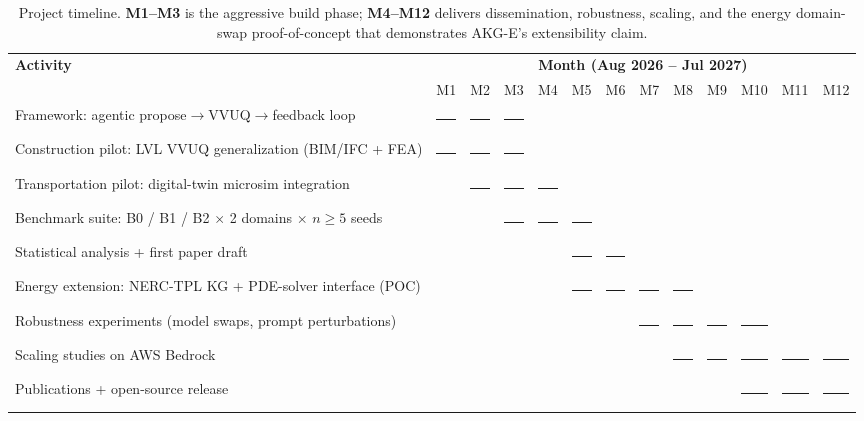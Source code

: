 \documentclass[conference, 10pt]{IEEEtran}
\newcommand{\gantt}{\rule[0.5pt]{14pt}{6pt}}
\begin{document}
\begin{table}[!ht]
\centering
\renewcommand{\arraystretch}{1.15}
\setlength{\tabcolsep}{4pt}
\caption{Project timeline. \textbf{M1--M3} is the aggressive build phase; \textbf{M4--M12} delivers dissemination, robustness, scaling, and the energy domain-swap proof-of-concept that demonstrates AKG-E's extensibility claim.}
\label{tab:gantt}
\footnotesize
\begin{tabular}{p{2.7in}|cccccccccccc}
\toprule
\textbf{Activity} & \multicolumn{12}{c}{\textbf{Month (Aug 2026 -- Jul 2027)}} \\
& M1 & M2 & M3 & M4 & M5 & M6 & M7 & M8 & M9 & M10 & M11 & M12 \\
\midrule
Framework: agentic propose$\to$VVUQ$\to$feedback loop & \gantt & \gantt & \gantt & & & & & & & & & \\
Construction pilot: LVL VVUQ generalization (BIM/IFC + FEA) & \gantt & \gantt & \gantt & & & & & & & & & \\
Transportation pilot: digital-twin microsim integration & & \gantt & \gantt & \gantt & & & & & & & & \\
Benchmark suite: B0 / B1 / B2 $\times$ 2 domains $\times$ $n{\geq}5$ seeds & & & \gantt & \gantt & \gantt & & & & & & & \\
Statistical analysis + first paper draft & & & & & \gantt & \gantt & & & & & & \\
Energy extension: NERC-TPL KG + PDE-solver interface (POC) & & & & & \gantt & \gantt & \gantt & \gantt & & & & \\
Robustness experiments (model swaps, prompt perturbations) & & & & & & & \gantt & \gantt & \gantt & \gantt & & \\
Scaling studies on AWS Bedrock & & & & & & & & \gantt & \gantt & \gantt & \gantt & \gantt \\
Publications + open-source release & & & & & & & & & & \gantt & \gantt & \gantt \\
\bottomrule
\end{tabular}
\end{table}
\end{document}
